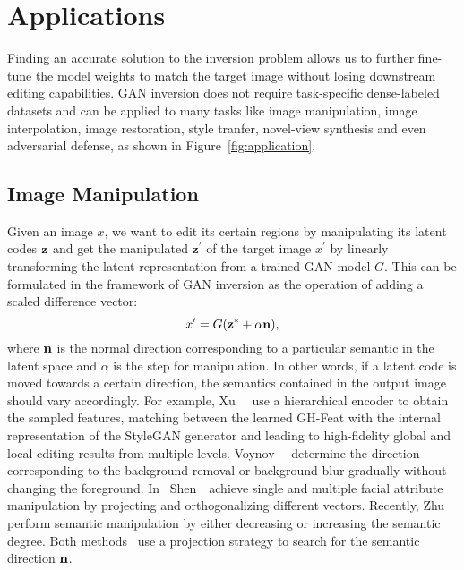 \section{Applications}
\label{sec:applications}

Finding an accurate solution to the inversion problem allows us to further fine-tune the model weights to match the target image without losing downstream editing capabilities.
GAN inversion does not require task-specific dense-labeled datasets and can be applied to many tasks like image manipulation, image interpolation, image restoration, style tranfer, novel-view synthesis and even adversarial defense, as shown in Figure~\ref{fig:application}.

\subsection{Image Manipulation}
\label{sec:manipulation}

Given an image $x$, we want to edit its certain regions by manipulating its latent codes $\mathbf{z}$ and get the manipulated ${\mathbf{z^{\prime}}}$ of the target image ${x^{\prime}}$ by linearly transforming the latent representation from a trained GAN model $G$. 
This can be formulated in the framework of GAN inversion as the operation of adding a scaled difference vector:
\begin{equation}
x^{\prime}=G(\mathbf{z}^{*}+\alpha \mathbf{n}), 
\end{equation}
where $\mathbf{n}$ is the normal direction corresponding to a particular semantic in the latent space and $\alpha$ is the step for manipulation. 
In other words, if a latent code is moved towards a certain direction, the semantics contained in the output image should vary accordingly. 
For example, Xu~\etal~\cite{xu2021ghfeat} use a hierarchical encoder to obtain the sampled features, matching between the learned GH-Feat with the internal representation of the StyleGAN generator and leading to high-fidelity global and local editing results from multiple levels.
Voynov~\etal~\cite{voynov2020latent} determine the direction corresponding to the background removal or background blur gradually without changing the foreground.
In~\cite{shen2020interpreting} Shen~\etal~achieve single and multiple facial attribute manipulation by projecting and orthogonalizing different vectors.
Recently, Zhu~\etal~\cite{zhu2020indomain} perform semantic manipulation by either decreasing or increasing the semantic degree. 
Both methods~\cite{shen2020interpreting,zhu2020indomain} use a projection strategy to search for the semantic direction $\mathbf{n}$.

